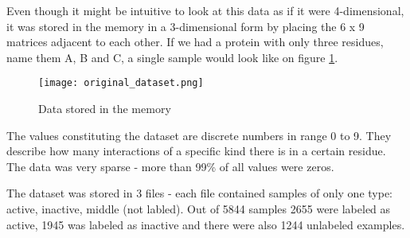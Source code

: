 \documentclass[a4paper,10pt]{report}
\begin{document}
	Even though it might be intuitive to look at this data as if it were 4-dimensional, it was stored in the memory in a 3-dimensional form by placing the 6 x 9 matrices adjacent to each other. If we had a protein with only three residues, name them A, B and C, a single sample would look like on figure \ref{fig:data_original}. 
	
	\begin{figure}[h!]
	  \centering
	  \texttt{[image: original\_dataset.png]}
	  \caption{Data stored in the memory}
	  \label{fig:data_original}
	\end{figure} 
	
	The values constituting the dataset are discrete numbers in range 0 to 9. They describe how many interactions of a specific kind there is in a certain residue. The data was very sparse - more than 99\% of all values were zeros. 
	
	The dataset was stored in 3 files - each file contained samples of only one type: active, inactive, middle (not labled). Out of 5844 samples 2655 were labeled as active, 1945 was labeled as inactive and there were also 1244 unlabeled examples. 
	

	    
           
	    
\end{document}
